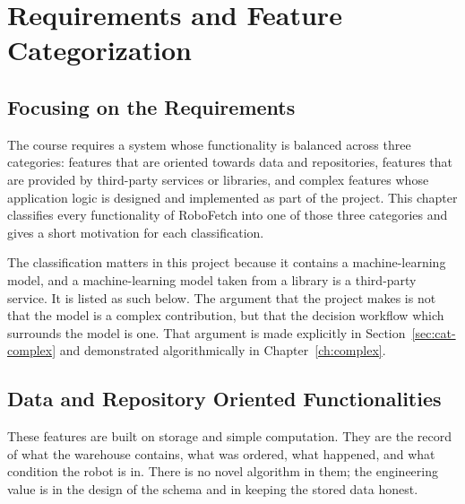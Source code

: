 \documentclass[12pt,a4paper]{report}
\begin{document}
\chapter{Requirements and Feature Categorization}
\label{ch:categorization}

\section{Focusing on the Requirements}
The course requires a system whose functionality is balanced across three categories: features
that are oriented towards data and repositories, features that are provided by third-party
services or libraries, and complex features whose application logic is designed and implemented as
part of the project. This chapter classifies every functionality of RoboFetch into one of those
three categories and gives a short motivation for each classification.

The classification matters in this project because it contains a machine-learning model, and a
machine-learning model taken from a library is a third-party service. It is listed as such below.
The argument that the project makes is not that the model is a complex contribution, but that the
decision workflow which surrounds the model is one. That argument is made explicitly in
Section~\ref{sec:cat-complex} and demonstrated algorithmically in Chapter~\ref{ch:complex}.

\section{Data and Repository Oriented Functionalities}
These features are built on storage and simple computation. They are the record of what the
warehouse contains, what was ordered, what happened, and what condition the robot is in. There is
no novel algorithm in them; the engineering value is in the design of the schema and in keeping the
stored data honest.
\end{document}
